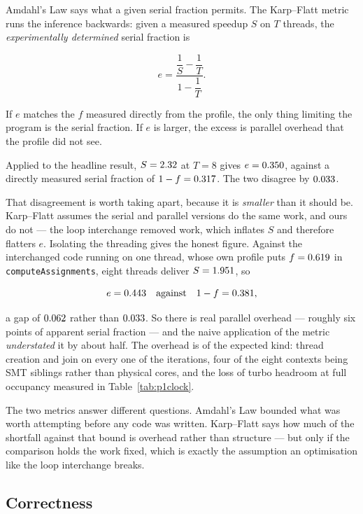 \documentclass[11pt,a4paper]{article}
\begin{document}
Amdahl's Law says what a given serial fraction permits. The Karp--Flatt metric
runs the inference backwards: given a measured speedup $S$ on $T$ threads, the
\emph{experimentally determined} serial fraction is

\[
e = \frac{\dfrac{1}{S} - \dfrac{1}{T}}{1 - \dfrac{1}{T}} .
\]

If $e$ matches the $f$ measured directly from the profile, the only thing
limiting the program is the serial fraction. If $e$ is larger, the excess is
parallel overhead that the profile did not see.

Applied to the headline result, $S = 2.32$ at $T = 8$ gives
$e = 0.350$, against a directly measured serial fraction of
$1 - f = 0.317$. The two disagree by $0.033$.

That disagreement is worth taking apart, because it is \emph{smaller} than it
should be. Karp--Flatt assumes the serial and parallel versions do the same
work, and ours do not --- the loop interchange removed work, which inflates $S$
and therefore flatters $e$. Isolating the threading gives the honest figure.
Against the interchanged code running on one thread, whose own profile puts
$f = 0.619$ in \texttt{computeAssignments}, eight threads deliver
$S = 1.951$, so

\[
e = 0.443 \quad\text{against}\quad 1 - f = 0.381 ,
\]

a gap of $0.062$ rather than $0.033$. So there is
real parallel overhead --- roughly six points of apparent serial fraction ---
and the naive application of the metric \emph{understated} it by about half.
The overhead is of the expected kind: thread creation and join on every one of
the \prognSixIters{} iterations, four of the eight contexts being SMT siblings
rather than physical cores, and the loss of turbo headroom at full occupancy
measured in Table~\ref{tab:p1clock}.

The two metrics answer different questions. Amdahl's Law bounded what was worth
attempting before any code was written. Karp--Flatt says how much of the
shortfall against that bound is overhead rather than structure --- but only if
the comparison holds the work fixed, which is exactly the assumption an
optimisation like the loop interchange breaks.

\subsection{Correctness}
\end{document}
